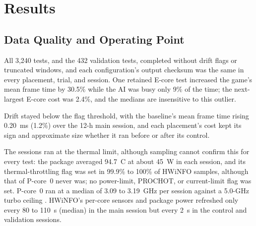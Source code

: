 \documentclass[conference]{IEEEtran}
\begin{document}
\section{Results}
\label{sec:results}
\subsection{Data Quality and Operating Point}
\label{sec:quality}
All 3,240 tests, and the 432 validation tests, completed without drift flags or truncated windows, and each configuration's output checksum was the same in every placement, trial, and session. One retained E-core test increased the game's mean frame time by 30.5\% while the AI was busy only 9\% of the time; the next-largest E-core cost was 2.4\%, and the medians are insensitive to this outlier.

Drift stayed below the flag threshold, with the baseline's mean frame time rising 0.20~ms (1.2\%) over the 12-h main session, and each placement's cost kept its sign and approximate size whether it ran before or after its control.

The sessions ran at the thermal limit, although sampling cannot confirm this for every test: the package averaged 94.7~\textdegree C at about 45~W in each session, and its thermal-throttling flag was set in 99.9\% to 100\% of HWiNFO samples, although that of P-core~0 never was; no power-limit, PROCHOT, or current-limit flag was set. P-core~0 ran at a median of 3.09 to 3.19~GHz per session against a 5.0-GHz turbo ceiling \cite{intelspec}. HWiNFO's per-core sensors and package power refreshed only every 80 to 110~s (median) in the main session but every 2~s in the control and validation sessions.
\end{document}
